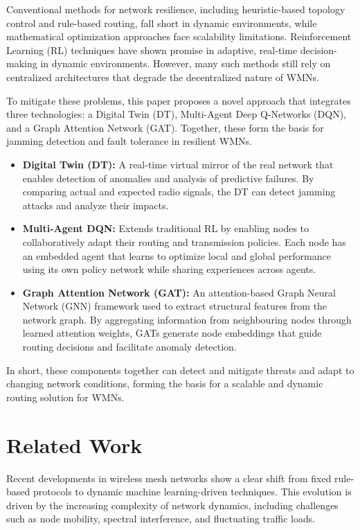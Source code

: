 \documentclass[conference]{IEEEtran}
\begin{document}
Conventional methods for network resilience, including heuristic-based topology control and rule-based routing, fall short in dynamic environments, while mathematical optimization approaches face scalability limitations. Reinforcement Learning (RL) techniques have shown promise in adaptive, real-time decision-making in dynamic environments. However, many such methods still rely on centralized architectures that degrade the decentralized nature of WMNs.

To mitigate these problems, this paper proposes a novel approach that integrates three technologies: a Digital Twin (DT), Multi-Agent Deep Q-Networks (DQN), and a Graph Attention Network (GAT). Together, these form the basis for jamming detection and fault tolerance in resilient WMNs.

\begin{itemize}
  \item \textbf{Digital Twin (DT):} A real-time virtual mirror of the real network that enables detection of anomalies and analysis of predictive failures. By comparing actual and expected radio signals, the DT can detect jamming attacks and analyze their impacts.
  \item \textbf{Multi-Agent DQN:} Extends traditional RL by enabling nodes to collaboratively adapt their routing and transmission policies. Each node has an embedded agent that learns to optimize local and global performance using its own policy network while sharing experiences across agents.
  \item \textbf{Graph Attention Network (GAT):} An attention-based Graph Neural Network (GNN) framework used to extract structural features from the network graph. By aggregating information from neighbouring nodes through learned attention weights, GATs generate node embeddings that guide routing decisions and facilitate anomaly detection.
\end{itemize}

In short, these components together can detect and mitigate threats and adapt to changing network conditions, forming the basis for a scalable and dynamic routing solution for WMNs.

\section{Related Work}

Recent developments in wireless mesh networks show a clear shift from fixed rule-based protocols to dynamic machine learning-driven techniques. This evolution is driven by the increasing complexity of network dynamics, including challenges such as node mobility, spectral interference, and fluctuating traffic loads.
\end{document}
